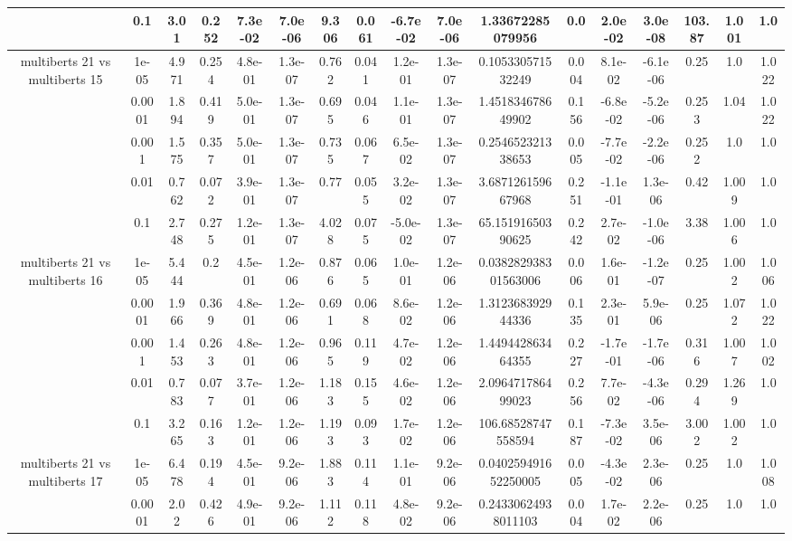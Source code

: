 \begin{tabular}{|c|c|c|c|c|c|c|c|c|c|c|c|c|c|c|c|c|}
 & 0.1 & 3.01 & 0.252 & 7.3e-02 & 7.0e-06 & 9.306 & 0.061 & -6.7e-02 & 7.0e-06 & 1.33672285079956 & 0.0 & 2.0e-02 & 3.0e-08 & 103.87 & 1.001 & 1.0 \\
\hline
\multirow{5}{*}{multiberts 21 vs multiberts 15} & 1e-05 & 4.971 & 0.254 & 4.8e-01 & 1.3e-07 & 0.762 & 0.041 & 1.2e-01 & 1.3e-07 & 0.105330571532249 & 0.004 & 8.1e-02 & -6.1e-06 & 0.25 & 1.0 & 1.022 \\
 & 0.0001 & 1.894 & 0.419 & 5.0e-01 & 1.3e-07 & 0.695 & 0.046 & 1.1e-01 & 1.3e-07 & 1.451834678649902 & 0.156 & -6.8e-02 & -5.2e-06 & 0.253 & 1.04 & 1.022 \\
 & 0.001 & 1.575 & 0.357 & 5.0e-01 & 1.3e-07 & 0.735 & 0.067 & 6.5e-02 & 1.3e-07 & 0.254652321338653 & 0.005 & -7.7e-02 & -2.2e-06 & 0.252 & 1.0 & 1.0 \\
 & 0.01 & 0.762 & 0.072 & 3.9e-01 & 1.3e-07 & 0.77 & 0.055 & 3.2e-02 & 1.3e-07 & 3.687126159667968 & 0.251 & -1.1e-01 & 1.3e-06 & 0.42 & 1.009 & 1.0 \\
 & 0.1 & 2.748 & 0.275 & 1.2e-01 & 1.3e-07 & 4.028 & 0.075 & -5.0e-02 & 1.3e-07 & 65.15191650390625 & 0.242 & 2.7e-02 & -1.0e-06 & 3.38 & 1.006 & 1.0 \\
\hline
\multirow{5}{*}{multiberts 21 vs multiberts 16} & 1e-05 & 5.444 & 0.2 & 4.5e-01 & 1.2e-06 & 0.876 & 0.065 & 1.0e-01 & 1.2e-06 & 0.038282938301563006 & 0.006 & 1.6e-01 & -1.2e-07 & 0.25 & 1.002 & 1.006 \\
 & 0.0001 & 1.966 & 0.369 & 4.8e-01 & 1.2e-06 & 0.691 & 0.068 & 8.6e-02 & 1.2e-06 & 1.312368392944336 & 0.135 & 2.3e-01 & 5.9e-06 & 0.25 & 1.072 & 1.022 \\
 & 0.001 & 1.453 & 0.263 & 4.8e-01 & 1.2e-06 & 0.965 & 0.119 & 4.7e-02 & 1.2e-06 & 1.449442863464355 & 0.227 & -1.7e-01 & -1.7e-06 & 0.316 & 1.007 & 1.002 \\
 & 0.01 & 0.783 & 0.077 & 3.7e-01 & 1.2e-06 & 1.183 & 0.155 & 4.6e-02 & 1.2e-06 & 2.096471786499023 & 0.256 & 7.7e-02 & -4.3e-06 & 0.294 & 1.269 & 1.0 \\
 & 0.1 & 3.265 & 0.163 & 1.2e-01 & 1.2e-06 & 1.193 & 0.093 & 1.7e-02 & 1.2e-06 & 106.68528747558594 & 0.187 & -7.3e-02 & 3.5e-06 & 3.002 & 1.002 & 1.0 \\
\hline
\multirow{5}{*}{multiberts 21 vs multiberts 17} & 1e-05 & 6.478 & 0.194 & 4.5e-01 & 9.2e-06 & 1.883 & 0.114 & 1.1e-01 & 9.2e-06 & 0.040259491652250005 & 0.005 & -4.3e-02 & 2.3e-06 & 0.25 & 1.0 & 1.008 \\
 & 0.0001 & 2.02 & 0.426 & 4.9e-01 & 9.2e-06 & 1.112 & 0.118 & 4.8e-02 & 9.2e-06 & 0.24330624938011103 & 0.004 & 1.7e-02 & 2.2e-06 & 0.25 & 1.0 & 1.0 \\

\end{tabular}
